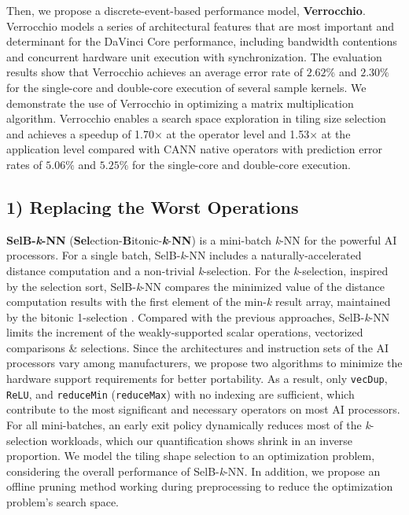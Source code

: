 Then, we propose a discrete-event-based performance model, \textbf{Verrocchio}. Verrocchio models a series of architectural features that are most important and determinant for the DaVinci Core performance, including bandwidth contentions and concurrent hardware unit execution with synchronization. The evaluation results show that Verrocchio achieves an average error rate of $2.62\%$ and $2.30\%$ for the single-core and double-core execution of several sample kernels. We demonstrate the use of Verrocchio in optimizing a matrix multiplication algorithm. Verrocchio enables a search space exploration in tiling size selection and achieves a speedup of 1.70$\times$ at the operator level and 1.53$\times$ at the application level compared with CANN \cite{CANN} native operators with prediction error rates of $5.06\%$ and $5.25\%$ for the single-core and double-core execution.

\subsection{1) Replacing the Worst Operations}

\textbf{SelB-\textit{k}-NN} (\textbf{Sel}ection-\textbf{B}itonic-\textbf{\textit{k}}-\textbf{NN}) is a mini-batch \textit{k}-NN for the powerful AI processors. For a single batch, SelB-\textit{k}-NN includes a naturally-accelerated distance computation and a non-trivial \textit{k}-selection. For the \textit{k}-selection, inspired by the selection sort, SelB-\textit{k}-NN compares the minimized value of the distance computation results with the first element of the min-\textit{k} result array, maintained by the bitonic 1-selection \cite{DBLP:conf/sigmod/ShanbhagPM18}. Compared with the previous approaches, SelB-\textit{k}-NN limits the increment of the weakly-supported scalar operations, vectorized comparisons \& selections. Since the architectures and instruction sets of the AI processors vary among manufacturers, we propose two algorithms to minimize the hardware support requirements for better portability. As a result, only \verb|vecDup|, \verb|ReLU|, and \verb|reduceMin| (\verb|reduceMax|) with no indexing are sufficient, which contribute to the most significant and necessary operators on most AI processors. For all mini-batches, an early exit policy dynamically reduces most of the \textit{k}-selection workloads, which our quantification shows shrink in an inverse proportion. We model the tiling shape selection to an optimization problem, considering the overall performance of SelB-\textit{k}-NN. In addition, we propose an offline pruning method working during preprocessing to reduce the optimization problem's search space.

